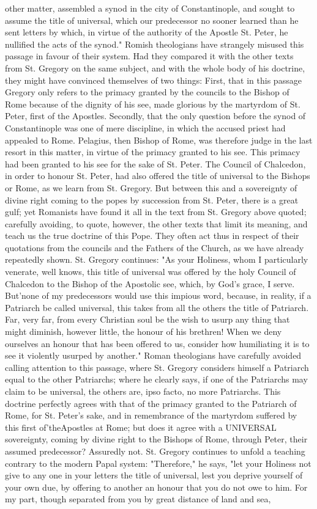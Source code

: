 other matter, assembled a synod in the city of Constantinople, and sought to assume the title of universal, which our predecessor no sooner learned than he sent letters by which, in virtue of the authority of the Apostle St. Peter, he nullified the acts of the synod." Romish theologians have strangely misused this passage in favour of their system. Had they compared it with the other texts from St. Gregory on the same subject, and with the whole body of his doctrine, they might have convinced themselves of two things: First, that in this passage Gregory only refers to the primacy granted by the councils to the Bishop of Rome because of the dignity of his see, made glorious by the martyrdom of St. Peter, first of the Apostles. Secondly, that the only question before the synod of Constantinople was one of mere discipline, in which the accused priest had appealed to Rome. Pelagius, then Bishop of Rome, was therefore judge in the last resort in this matter, in virtue of the primacy granted to his see. This primacy had been granted to his see for the sake of St. Peter. The Council of Chalcedon, in order to honour St. Peter, had also offered the title of universal to the Bishops or Rome, as we learn from St. Gregory. But between this and a sovereignty of divine right coming to the popes by succession from St. Peter, there is a great gulf; yet Romanists have found it all in the text from St. Gregory above quoted; carefully avoiding, to quote, however, the other texts that limit its meaning, and teach us the true doctrine of this Pope. They often act thus in respect of their quotations from the councils and the Fathers of the Church, as we have already repeatedly shown. St. Gregory continues: "As your Holiness, whom I particularly venerate, well knows, this title of universal was offered by the holy Council of Chalcedon to the Bishop of the Apostolic see, which, by God's grace, I serve. But'none of my predecessors would use this impious word, because, in reality, if a Patriarch be called universal, this takes from all the others the title of Patriarch. Far, very far, from every Christian soul be the wish to usurp any thing that might diminish, however little, the honour of his brethren! When we deny ourselves an honour that has been offered to us, consider how humiliating it is to see it violently usurped by another." Roman theologians have carefully avoided calling attention to this passage, where St. Gregory considers himself a Patriarch equal to the other Patriarchs; where he clearly says, if one of the Patriarchs may claim to be universal, the others are, ipso facto, no more Patriarchs. This doctrine perfectly agrees with that of the primacy granted to the Patriarch of Rome, for St. Peter's sake, and in remembrance of the martyrdom suffered by this first of'theApostles at Rome; but does it agree with a UNIVERSAL sovereignty, coming by divine right to the Bishops of Rome, through Peter, their assumed predecessor? Assuredly not. St. Gregory continues to unfold a teaching contrary to the modern Papal system: "Therefore," he says, "let your Holiness not give to any one in your letters the title of universal, lest you deprive yourself of your own due, by offering to another an honour that you do not owe to him. For my part, though separated from you by great distance of land and sea, 